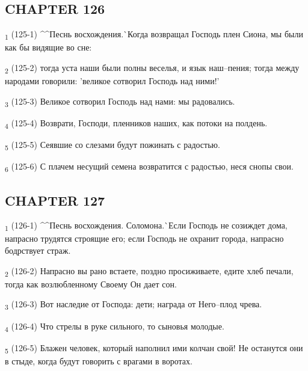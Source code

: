 \subsection{CHAPTER 126}
\begin{tcolorbox}
\textsubscript{1} (125-1) ^^Песнь восхождения.^^ Когда возвращал Господь плен Сиона, мы были как бы видящие во сне:
\end{tcolorbox}
\begin{tcolorbox}
\textsubscript{2} (125-2) тогда уста наши были полны веселья, и язык наш--пения; тогда между народами говорили: 'великое сотворил Господь над ними!'
\end{tcolorbox}
\begin{tcolorbox}
\textsubscript{3} (125-3) Великое сотворил Господь над нами: мы радовались.
\end{tcolorbox}
\begin{tcolorbox}
\textsubscript{4} (125-4) Возврати, Господи, пленников наших, как потоки на полдень.
\end{tcolorbox}
\begin{tcolorbox}
\textsubscript{5} (125-5) Сеявшие со слезами будут пожинать с радостью.
\end{tcolorbox}
\begin{tcolorbox}
\textsubscript{6} (125-6) С плачем несущий семена возвратится с радостью, неся снопы свои.
\end{tcolorbox}
\subsection{CHAPTER 127}
\begin{tcolorbox}
\textsubscript{1} (126-1) ^^Песнь восхождения. Соломона.^^ Если Господь не созиждет дома, напрасно трудятся строящие его; если Господь не охранит города, напрасно бодрствует страж.
\end{tcolorbox}
\begin{tcolorbox}
\textsubscript{2} (126-2) Напрасно вы рано встаете, поздно просиживаете, едите хлеб печали, тогда как возлюбленному Своему Он дает сон.
\end{tcolorbox}
\begin{tcolorbox}
\textsubscript{3} (126-3) Вот наследие от Господа: дети; награда от Него--плод чрева.
\end{tcolorbox}
\begin{tcolorbox}
\textsubscript{4} (126-4) Что стрелы в руке сильного, то сыновья молодые.
\end{tcolorbox}
\begin{tcolorbox}
\textsubscript{5} (126-5) Блажен человек, который наполнил ими колчан свой! Не останутся они в стыде, когда будут говорить с врагами в воротах.
\end{tcolorbox}
